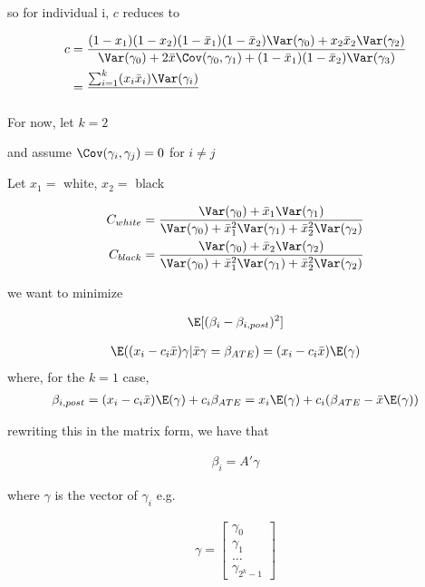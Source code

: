 so for individual i, $c$ reduces to

\begin{align*}
	c &= \frac{(1-x_1)(1- x_2)(1- \bar{x}_1)(1-\bar{x}_2) \Var(\gamma_0) +x_2 \bar{x}_2 \Var(\gamma_2)}{\Var(\gamma_0) + 2 \bar{x} \Cov(\gamma_0, \gamma_1) + (1- \bar{x}_1) (1 - \bar{x}_2)\Var(\gamma_3)} \\
	  &= \frac{\sum_{i=1}^{k} (x_i \bar{x}_i) \Var(\gamma_i)  } {}\\
\end{align*} 


For now, let $k=2$

and assume $\Cov(\gamma_i, \gamma_j) = 0$ for $i \neq j$

Let $x_1 = $ white, $x_2=$ black

\begin{align*}
		C_{white} &= \frac{\Var(\gamma_0) + \bar{x}_1 \Var(\gamma_1) }{\Var(\gamma_0) + \bar{x}_1^2\Var(\gamma_1) + \bar{x}_2^2\Var(\gamma_2)} \\
	C_{black} &= \frac{\Var(\gamma_0) + \bar{x}_2 \Var(\gamma_2)}{\Var(\gamma_0) + \bar{x}_1^2\Var(\gamma_1) + \bar{x}_2^2\Var(\gamma_2)} \\
\end{align*} 


we want to minimize

\begin{align*}
	\E [(\beta_i - \beta_{i, post})^2]
\end{align*} 

\begin{align*}
	\E((x_i - c_i \bar{x}) \gamma | \bar{x} \gamma = \beta_{ATE}) = (x_{i} - c_i \bar{x}) \E(\gamma)
\end{align*}
where, for the $k = 1$ case,
\begin{align*}
	\beta_{i, post} = (x_i - c_i \bar{x}) \E(\gamma) + c_i \beta_{ATE} = x_i \E(\gamma) + c_i (\beta_{ATE} - \bar{x} \E(\gamma))
\end{align*} 

rewriting this in the matrix form, we have that

\begin{align*}
	\beta_i = A' \gamma
\end{align*} 

where $\gamma$ is the vector of $\gamma_i$ e.g.

\begin{align*}
	\gamma = \begin{bmatrix}
		\gamma_0 \\
		\gamma_1 \\
		\ldots \\
		\gamma_{2^{k}-1}
	\end{bmatrix}
\end{align*}


